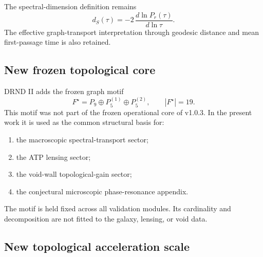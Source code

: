 \documentclass[12pt]{iopart}
\begin{document}
The spectral-dimension definition remains
\begin{equation}
d_S(\tau)
=
-2\,\frac{d\ln P_r(\tau)}{d\ln \tau}.
\end{equation}
The effective graph-transport interpretation through geodesic distance and mean first-passage time is also retained.

\subsection{New frozen topological core}

DRND II adds the frozen graph motif
\begin{equation}
F^\star
=
P_9\oplus P_5^{(1)}\oplus P_5^{(2)},
\qquad
|F^\star|=19.
\end{equation}
This motif was not part of the frozen operational core of v1.0.3. In the present work it is used as the common structural basis for:
\begin{enumerate}
    \item the macroscopic spectral-transport sector;
    \item the ATP lensing sector;
    \item the void-wall topological-gain sector;
    \item the conjectural microscopic phase-resonance appendix.
\end{enumerate}

The motif is held fixed across all validation modules. Its cardinality and decomposition are not fitted to the galaxy, lensing, or void data.

\subsection{New topological acceleration scale}
\end{document}
